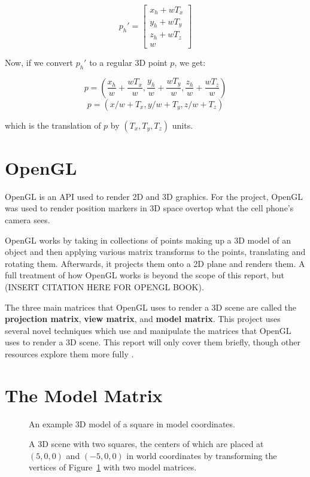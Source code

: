 \[
 p_{h}\prime = \begin{bmatrix}
 x_h + w T_x \\
 y_h + w T_y \\
 z_h + w T_z \\
 w
 \end{bmatrix}
 \]
 
 Now, if we convert $p_{h}\prime$ to a regular 3D point $p$, we get:
 
 \[ p = (\frac{x_h}{w} + \frac{w T_x}{w},  \frac{y_h}{w} + \frac{w T_y}{w}, \frac{z_h}{w} + \frac{w T_z}{w}) \]
 \[ p = (x/w + T_x, y/w + T_y, z/w + T_z) \]
 
 which is the translation of $p$ by $(T_x, T_y, T_z)$ units.
 
 \section{OpenGL}
OpenGL is an API used to render 2D and 3D graphics. For the project, OpenGL was used to render position markers in 3D space overtop what the cell phone's camera sees.

OpenGL works by taking in collections of points making up a 3D model of an object and then applying various matrix transforms to the points, translating and rotating them. Afterwards, it projects them onto a 2D plane and renders them. A full treatment of how OpenGL works is beyond the scope of this report, but (INSERT CITATION HERE FOR OPENGL BOOK).

The three main matrices that OpenGL uses to render a 3D scene are called the \textbf{projection matrix}, \textbf{view matrix}, and \textbf{model matrix}. This project uses several novel techniques which use and manipulate the matrices that OpenGL uses to render a 3D scene. This report will only cover them briefly, though other resources explore them more fully \cite{CodingLabs}.

\section{The Model Matrix}
\begin{figure}
	\centering
	
	\decoRule
	\caption{An example 3D model of a square in model coordinates.}
	\label{fig:ModelExample}
\end{figure}
\begin{figure}
	\centering
	
	\decoRule
	\caption{A 3D scene with two squares, the centers of which are placed at $(5, 0, 0)$ and $(-5, 0, 0)$ in world coordinates by transforming the vertices of Figure~\ref{fig:ModelExample} with two model matrices.}
	\label{fig:ModelMatrixExample}
\end{figure}

